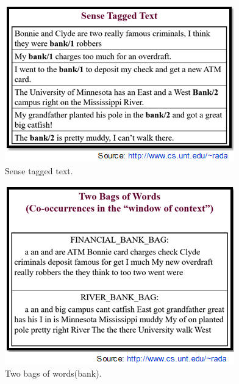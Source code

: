 \begin{figure}[tbh]
	\begin{center}
		\includegraphics[width=\columnwidth]{Union_Background_Chart_sup1}
	\end{center}
	\caption{Sense tagged text.}
\end{figure}
\begin{figure}[tbh]
	\begin{center}
		\includegraphics[width=\columnwidth]{Union_Background_Chart_sup2}
	\end{center}
	\caption{Two bags of words(bank).}
\end{figure}
